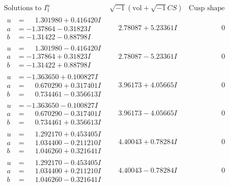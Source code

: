 \documentclass[1p]{elsarticle_modified}
\theoremstyle{definition}
\newcommand{\I}{\sqrt{-1}}
\begin{document}
$$\begin{array}{c|c|c}
\text{Solutions to }I^u_{1}& \I (\text{vol} + \sqrt{-1}CS) & \text{Cusp shape}\\
 \hline 
\begin{aligned}
u &= \phantom{-}1.301980 + 0.416420 I \\
a &= -1.37864 - 0.31823 I \\
b &= -1.31422 - 0.88798 I\end{aligned}
 & \phantom{-}2.78087 + 5.23361 I & \phantom{-0.000000 } 0 \\ \hline\begin{aligned}
u &= \phantom{-}1.301980 - 0.416420 I \\
a &= -1.37864 + 0.31823 I \\
b &= -1.31422 + 0.88798 I\end{aligned}
 & \phantom{-}2.78087 - 5.23361 I & \phantom{-0.000000 } 0 \\ \hline\begin{aligned}
u &= -1.363650 + 0.100827 I \\
a &= \phantom{-}0.670290 + 0.317401 I \\
b &= \phantom{-}0.734461 - 0.356613 I\end{aligned}
 & \phantom{-}3.96173 + 4.05665 I & \phantom{-0.000000 } 0 \\ \hline\begin{aligned}
u &= -1.363650 - 0.100827 I \\
a &= \phantom{-}0.670290 - 0.317401 I \\
b &= \phantom{-}0.734461 + 0.356613 I\end{aligned}
 & \phantom{-}3.96173 - 4.05665 I & \phantom{-0.000000 } 0 \\ \hline\begin{aligned}
u &= \phantom{-}1.292170 + 0.453405 I \\
a &= \phantom{-}1.034400 - 0.211210 I \\
b &= \phantom{-}1.046260 + 0.321641 I\end{aligned}
 & \phantom{-}4.40043 + 0.78284 I & \phantom{-0.000000 } 0 \\ \hline\begin{aligned}
u &= \phantom{-}1.292170 - 0.453405 I \\
a &= \phantom{-}1.034400 + 0.211210 I \\
b &= \phantom{-}1.046260 - 0.321641 I\end{aligned}
 & \phantom{-}4.40043 - 0.78284 I & \phantom{-0.000000 } 0 \\ \hline\begin{aligned}

\end{aligned}
\end{array}$$
\end{document}

